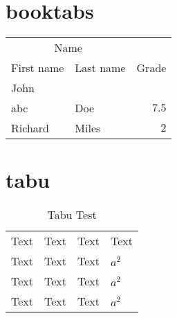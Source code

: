 \documentclass{ctexart}
\begin{document}
\section{booktabs}
\begin{tabular}{llr}
\toprule
\multicolumn{2}{c}{Name} \\
\cmidrule(r){1-2}
First name & Last name & Grade \\
\midrule
John\\abc & Doe & $7.5$ \\
Richard & Miles & $2$\\
\bottomrule
\end{tabular}

\section{tabu}

\begin{table}[h]
\caption{Tabu Test}
\begin{tabu}{|X[1,l]|X[2,c]|X[3,c]|X[1,r]|}
Text & Text & Text & Text \\ 
Text & Text & Text & $a^2$ \\
Text & Text & Text & $a^2$ \\
Text & Text & Text & $a^2$
\end{tabu} 
\end{table}
\end{document}

